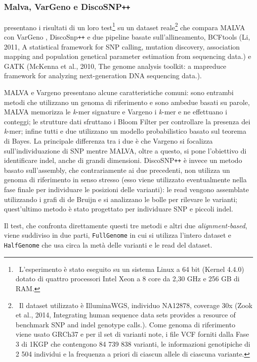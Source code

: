 \documentclass[../main.tex]{subfiles}
\begin{document}
\subsubsection{Malva, VarGeno e DiscoSNP\texttt{++}}

\noindent
\cite{bernardini2019malva} presentano i risultati di un loro test\footnote{\ L'esperimento è stato eseguito su un sistema Linux a 64 bit (Kernel 4.4.0) dotato di quattro processori Intel Xeon a 8 core da 2,30 GHz e 256 GB di RAM.} su un dataset reale\footnote{\ Il dataset utilizzato è IlluminaWGS, individuo NA12878, coverage 30x (Zook et al., 2014, Integrating human sequence data sets provides a resource of benchmark SNP and indel genotype calls.). Come genoma di riferimento viene usato GRCh37 e per il set di varianti note, i file VCF forniti dalla Fase 3 di 1KGP che contengono  84 739 838 varianti, le informazioni genotipiche di 2 504 individui e la frequenza a priori di ciascun allele di ciascuna variante.} che compara MALVA con VarGeno \cite{sun-medvedev2018vargeno}, DiscoSnp\texttt{++} \cite{peterlongo2017discosnp++} e due pipeline basate sull'allineamento, BCFtools (Li, 2011, A statistical framework for SNP calling, mutation discovery, association mapping and population genetical parameter estimation from sequencing data.) e GATK (McKenna et al., 2010, The genome analysis toolkit: a mapreduce framework for analyzing next-generation DNA sequencing data.). 

MALVA e Vargeno presentano alcune caratteristiche comuni: sono entrambi metodi che utilizzano un genoma di riferimento e sono ambedue basati su parole, MALVA memorizza le \textit{k}-mer signature e Vargeno i \textit{k}-mer e ne effettuano i conteggi; le strutture dati sfruttano i Bloom Filter per controllare la presenza dei \textit{k}-mer; infine tutti e due utilizzano un modello probabilistico basato sul teorema di Bayes. La principale differenza tra i due è che Vargeno si focalizza sull'individuazione di SNP mentre MALVA, oltre a questo, si pone l'obiettivo di identificare indel, anche di grandi dimensioni. DiscoSNP\texttt{++} è invece un metodo basato sull'assembly, che contrariamente ai due precedenti, non utilizza un genoma di riferimento in senso stresso (esso viene utilizzato eventualmente nella fase finale per individuare le posizioni delle varianti): le read vengono assemblate utilizzando i grafi di de Bruijn e si analizzano le bolle per rilevare le varianti; quest'ultimo metodo è stato progettato per individuare SNP e piccoli indel.

Il test, che confronta direttamente questi tre metodi e altri due \textit{alignment-based}, viene suddiviso in due parti, \texttt{FullGenome} in cui si utilizza l'intero dataset e \texttt{HalfGenome} che usa circa la metà delle varianti e le read del dataset.
\end{document}

